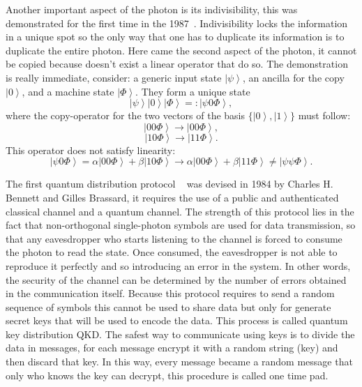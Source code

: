 Another important aspect of the photon is its indivisibility, this was demonstrated for the first time in the 1987~\cite{a23}. Indivisibility locks the information in a unique spot so the only way that one has to duplicate its information is to duplicate the entire photon. Here came the second aspect of the photon, it cannot be copied because doesn't exist a linear operator that do so. The demonstration is really immediate, consider: a generic input state $\left|\psi\right>$, an ancilla for the copy $\left|0\right>$, and a machine state $\left|\Phi\right>$. They form a unique state
\begin{equation}
  \left|\psi\right>\left|0\right>\left|\Phi\right> =: \left|\psi 0 \Phi\right>,
\end{equation}
where the copy-operator for the two vectors of the basis $\{\left|0\right>, \left|1\right>\}$ must follow:
\begin{equation}
  \left|0 0 \Phi\right> \to \left|0 0 \Phi\right>,
\end{equation}
\begin{equation}
  \left|1 0 \Phi\right> \to \left|1 1 \Phi\right>.
\end{equation}
This operator does not satisfy linearity:
\begin{equation}
  \left|\psi 0 \Phi\right> = \alpha\left|0 0 \Phi\right> + \beta\left|1 0 \Phi\right> \to \alpha\left|0 0 \Phi\right> + \beta\left|1 1 \Phi\right> \ne \left|\psi \psi \Phi\right>.
\end{equation}



The first quantum distribution protocol ~\cite{a9} was devised in 1984 by Charles H. Bennett and Gilles Brassard, it requires the use of a public and authenticated classical channel and a quantum channel. The strength of this protocol lies in the fact that non-orthogonal single-photon symbols are used for data transmission, so that any eavesdropper who starts listening to the channel is forced to consume the photon to read the state. Once consumed, the eavesdropper is not able to reproduce it perfectly and so introducing an error in the system. In other words, the security of the channel can be determined by the number of errors obtained in the communication itself. Because this protocol requires to send a random sequence of symbols this cannot be used to share data but only for generate secret keys that will be used to encode the data. This process is called quantum key distribution QKD. The safest way to communicate using keys is to divide the data in messages, for each message encrypt it with a random string (key) and then discard that key. In this way, every message became a random message that only who knows the key can decrypt, this procedure is called one time pad.

